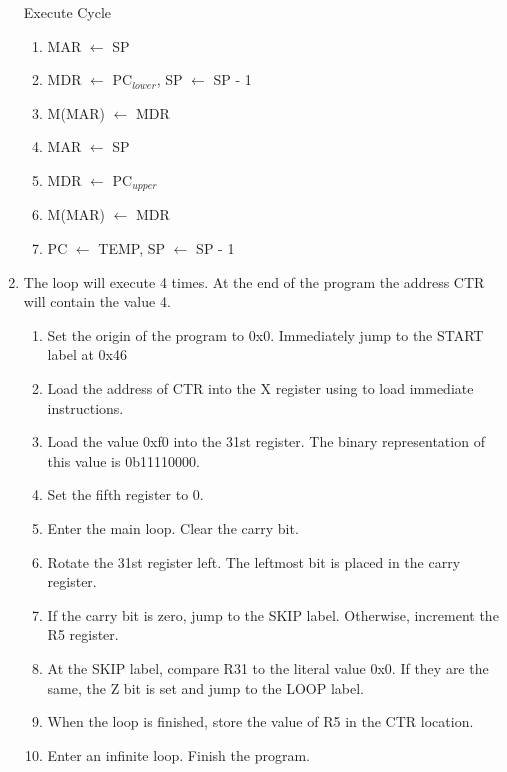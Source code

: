 \documentclass[12pt,letterpaper]{article}
\begin{document}
\begin{enumerate}
    Execute Cycle
    \begin{enumerate}[i]
        \item MAR $\leftarrow$ SP
        \item MDR $\leftarrow$ PC$_{lower}$, SP $\leftarrow$ SP - 1
        \item M(MAR) $\leftarrow$ MDR
        \item MAR $\leftarrow$ SP
        \item MDR $\leftarrow$ PC$_{upper}$
        \item M(MAR) $\leftarrow$ MDR
        \item PC $\leftarrow$ TEMP, SP $\leftarrow$ SP - 1
    \end{enumerate}
    \item The loop will execute 4 times. At the end of the program the address
    CTR will contain the value 4.

    \begin{enumerate}[i]
    \item Set the origin of the program to 0x0. Immediately jump to the START
    label at 0x46
    \item Load the address of CTR into the X register using to load immediate
    instructions.
    \item Load the value 0xf0 into the 31st register. The binary representation
    of this value is 0b11110000.
    \item Set the fifth register to 0.
    \item Enter the main loop. Clear the carry bit.
    \item Rotate the 31st register left. The leftmost bit is placed in the
    carry register.
    \item If the carry bit is zero, jump to the SKIP label. Otherwise,
    increment the R5 register.
    \item At the SKIP label, compare R31 to the literal value 0x0. If they are
    the same, the Z bit is set and jump to the LOOP label.
    \item When the loop is finished, store the value of R5 in the CTR location.
    \item Enter an infinite loop. Finish the program.

    \end{enumerate}


\end{enumerate}
\end{document}
